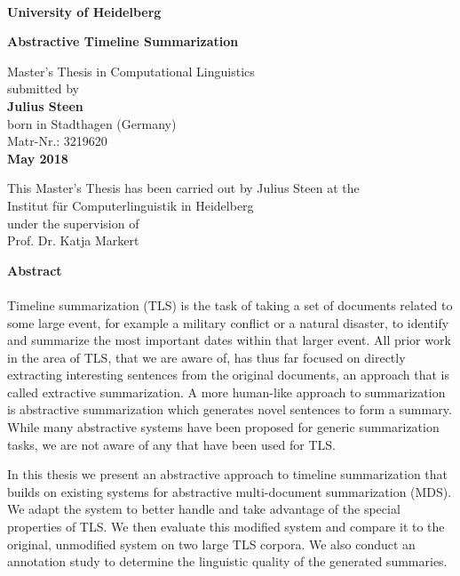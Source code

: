 \documentclass[a4paper,BCOR=10mm]{report}
\numberwithin{lemma}{chapter}
\numberwithin{definition}{chapter}
\begin{document}
\begin{titlepage}
\begin{center}
 
\Large\textbf{\\
University of Heidelberg}
\vspace{2cm}

\Huge\textbf{
Abstractive Timeline Summarization
}

\vspace{10cm}

\normalsize
Master's Thesis in Computational Linguistics\\
submitted by\\
\vspace{0.5cm}
\Large\textbf{Julius Steen}\\
\normalsize
\vspace{0.5cm}
born in Stadthagen (Germany)\\
\normalsize
Matr-Nr.: 3219620 \\
\vspace{0.5cm}
\Large\textbf{May 2018} \\
\normalsize

\newpage

\normalsize
This Master's Thesis has been carried out by Julius Steen at the\\
Institut für Computerlinguistik in Heidelberg\\
under the supervision of\\
Prof. Dr. Katja Markert
\vfill
\end{center}

\newpage
\noindent
\large\textbf{Abstract}\\
\\

Timeline summarization (TLS) is the task of taking a set of documents related to some large event, for example a military conflict or a natural disaster, to identify and summarize the most important dates within that larger event.
All prior work in the area of TLS, that we are aware of, has thus far focused on directly extracting interesting sentences from the original documents, an approach that is called extractive summarization. A more human-like approach to summarization is abstractive summarization which generates novel sentences to form a summary. While many abstractive systems have been proposed for generic summarization tasks, we are not aware of any that have been used for TLS.

In this thesis we present an abstractive approach to timeline summarization that builds on existing systems for abstractive multi-document summarization (MDS). We adapt the system to better handle and take advantage of the special properties of TLS. We then evaluate this modified system and compare it to the original, unmodified system on two large TLS corpora.
We also conduct an annotation study to determine the linguistic quality of the generated summaries.


\end{titlepage}
\end{document}
